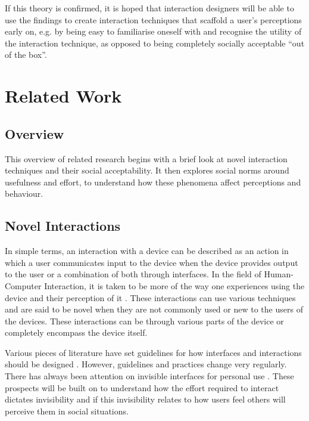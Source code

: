 \documentclass{l4proj}
\begin{document}
If this theory is confirmed, it is hoped that interaction designers will be able to use the findings to create interaction techniques that scaffold a user's perceptions early on, e.g. by being easy to familiarise oneself with and recognise the utility of the interaction technique, as opposed to being completely socially acceptable ``out of the box''.


\chapter{Related Work}
\section{Overview}

This overview of related research begins with a brief look at novel interaction techniques and their social acceptability. It then explores social norms around usefulness and effort, to understand how these phenomena affect perceptions and behaviour.

\section{Novel Interactions}

In simple terms, an interaction with a device can be described as an action in which a user communicates input to the device when the device provides output to the user or a combination of both through interfaces. In the field of Human-Computer Interaction, it is taken to be more of the way one experiences using the device and their perception of it \citep{beaudouin-lafon_designing_2004}. These interactions can use various techniques and are said to be novel when they are not commonly used or new to the users of the devices. These interactions can be through various parts of the device or completely encompass the device itself.

Various pieces of literature have set guidelines for how interfaces and interactions should be designed \citep{beaudouin-lafon_designing_2004, gong_guidelines_nodate}. However, guidelines and practices change very regularly. There has always been attention on invisible interfaces for personal use \citep{schiphorst_really_2007}. These prospects will be built on to understand how the effort required to interact dictates invisibility and if this invisibility relates to how users feel others will perceive them in social situations.
\end{document}
